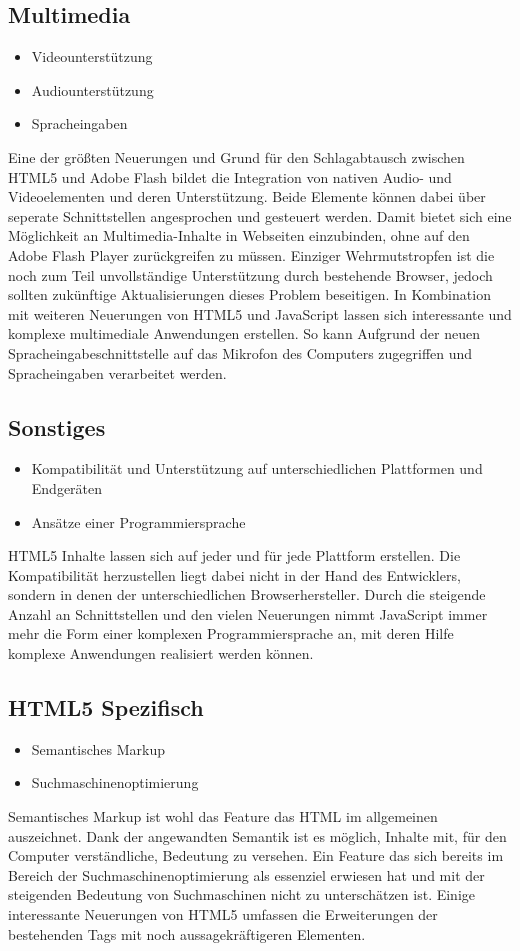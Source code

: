 \subsection{Multimedia}
\begin{itemize}
  \item{Videounterstützung}
  \item{Audiounterstützung}
  \item{Spracheingaben}
\end{itemize}
Eine der größten Neuerungen und Grund für den Schlagabtausch zwischen HTML5
und Adobe Flash bildet die Integration von nativen Audio- und Videoelementen
und deren Unterstützung. Beide Elemente können dabei über seperate
Schnittstellen angesprochen und gesteuert werden. Damit bietet sich eine
Möglichkeit an Multimedia-Inhalte in Webseiten einzubinden, ohne auf den Adobe
Flash Player zurückgreifen zu müssen. Einziger Wehrmutstropfen ist die noch
zum Teil unvollständige Unterstützung durch bestehende Browser, jedoch sollten
zukünftige Aktualisierungen dieses Problem beseitigen. In Kombination mit
weiteren Neuerungen von HTML5 und JavaScript lassen sich interessante und
komplexe multimediale Anwendungen erstellen. So kann Aufgrund der neuen
Spracheingabeschnittstelle auf das Mikrofon des Computers zugegriffen und
Spracheingaben verarbeitet werden.

\subsection{Sonstiges}
\begin{itemize}
  \item{
    Kompatibilität und Unterstützung auf unterschiedlichen Plattformen und
    Endgeräten
  }
  \item{Ansätze einer Programmiersprache}
\end{itemize}
HTML5 Inhalte lassen sich auf jeder und für jede Plattform erstellen.
Die Kompatibilität herzustellen liegt dabei nicht in der Hand des Entwicklers,
sondern in denen der unterschiedlichen Browserhersteller. Durch die steigende
Anzahl an Schnittstellen und den vielen Neuerungen nimmt JavaScript immer mehr
die Form einer komplexen Programmiersprache an, mit deren Hilfe komplexe
Anwendungen realisiert werden können.

\subsection{HTML5 Spezifisch}
\begin{itemize}
  \item{Semantisches Markup}
  \item{Suchmaschinenoptimierung}
\end{itemize}
Semantisches Markup ist wohl das Feature das HTML im allgemeinen auszeichnet.
Dank der angewandten Semantik ist es möglich, Inhalte mit, für den Computer
verständliche, Bedeutung zu versehen. Ein Feature das sich bereits im
Bereich der Suchmaschinenoptimierung als essenziel erwiesen hat und mit der
steigenden Bedeutung von Suchmaschinen nicht zu unterschätzen ist. Einige
interessante Neuerungen von HTML5 umfassen die Erweiterungen der bestehenden
Tags mit noch aussagekräftigeren Elementen.

